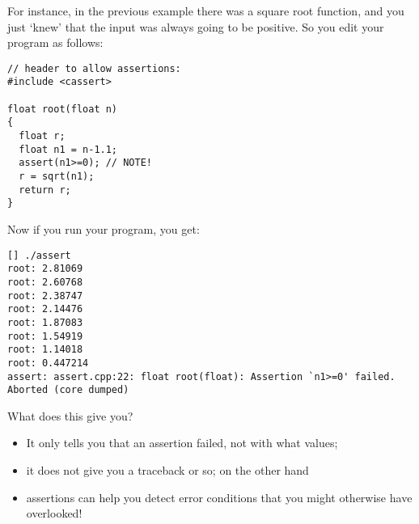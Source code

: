 For instance, in the previous example there was a square root function,
and you just `knew' that the input was always going to be positive.
So you edit your program as follows:
\begin{lstlisting}
// header to allow assertions:
#include <cassert>

float root(float n)
{
  float r;
  float n1 = n-1.1;
  assert(n1>=0); // NOTE!
  r = sqrt(n1);
  return r;
}
\end{lstlisting}
Now if you run your program, you get:
\begin{verbatim}
[] ./assert
root: 2.81069
root: 2.60768
root: 2.38747
root: 2.14476
root: 1.87083
root: 1.54919
root: 1.14018
root: 0.447214
assert: assert.cpp:22: float root(float): Assertion `n1>=0' failed.
Aborted (core dumped)
\end{verbatim}
What does this give you?
\begin{itemize}
\item It only tells you that an assertion failed, not with what values;
\item it does not give you a traceback or so; on the other hand
\item assertions can help you detect error conditions that you might
  otherwise have overlooked!
\end{itemize}

